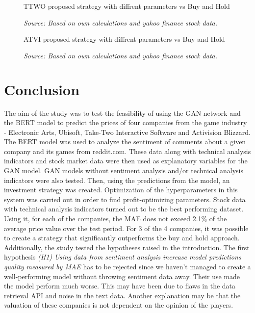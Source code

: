\documentclass[review]{elsarticle} %
\begin{document}
\begin{figure}[H]
\caption{TTWO proposed strategy with diffrent parameters vs Buy and Hold}
\begin{adjustbox}{width=1.3\textwidth,center}

\end{adjustbox}
\caption*{\textit{Source: Based on own calculations and yahoo finance stock data.}}
\end{figure}

\begin{figure}[H]
\caption{ATVI proposed strategy with diffrent parameters vs Buy and Hold}
\begin{adjustbox}{width=1.3\textwidth,center}

\end{adjustbox}
\caption*{\textit{Source: Based on own calculations and yahoo finance stock data.}}
\end{figure}



\section{Conclusion}

The aim of the study was to test the feasibility of using the GAN network and the BERT model to predict the prices of four companies from the game industry -  Electronic Arts, Ubisoft, Take-Two Interactive Software and Activision Blizzard. The BERT model was used to analyze the sentiment of comments about a given company and its games from reddit.com. These data along with technical analysis indicators and stock market data were then used as explanatory variables for the GAN model. GAN models without sentiment analysis and/or technical analysis indicators were also tested. Then, using the predictions from the model, an investment strategy was created. Optimization of the hyperparameters in this system was carried out in order to find profit-optimizing parameters. Stock data with technical analysis indicators turned out to be the best performing dataset. Using it, for each of the companies, the MAE does not exceed 2.1\% of the average price value over the test period. For 3 of the 4 companies, it was possible to create a strategy that significantly outperforms the buy and hold approach. \\

Additionally, the study tested the hypotheses raised in the introduction. The first hypothesis \textit{(H1) Using data from sentiment analysis increase model predictions quality measured by MAE} has to be rejected since we haven't managed to create a well-performing model without throwing sentiment data away. Their use made the model perform much worse. This may have been due to flaws in the data retrieval API and noise in the text data. Another explanation may be that the valuation of these companies is not dependent on the opinion of the players. \\
\end{document}
